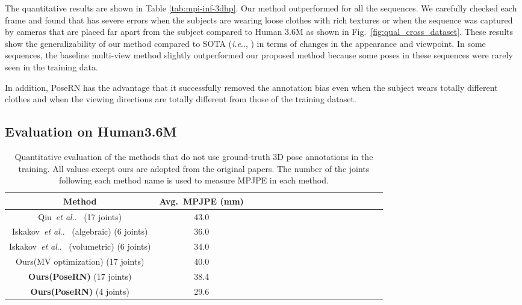 \documentclass{article}
\makeatletter
\newcommand{\figref}[1]{{Fig.~\ref{fig:#1}}}
\newcommand{\tabref}[1]{{Table \ref{tab:#1}}}
\DeclareRobustCommand\onedot{\futurelet\@let@token\@onedot}
\def\@onedot{\ifx\@let@token.\else.\null\fi\xspace}
\def\ie{\emph{i.e}\onedot} \def\Ie{\emph{I.e}\onedot}
\def\etal{\emph{et al}\onedot}
\makeatother
\begin{document}
The quantitative results are shown in \tabref{mpi-inf-3dhp}. Our method outperformed \cite{iskakov2019learnable} for all the sequences. We carefully checked each frame and found that \cite{iskakov2019learnable} has severe errors when the subjects are wearing loose clothes with rich textures or when the sequence was captured by cameras that are placed far apart from the subject compared to Human 3.6M as shown in \figref{qual_cross_dataset}. These results show the generalizability of our method compared to SOTA (\ie, \cite{iskakov2019learnable}) in terms of changes in the appearance and viewpoint. 
In some sequences, the baseline multi-view method slightly outperformed our proposed method because some poses in these sequences were rarely seen in the training data.

In addition, PoseRN has the advantage that it successfully removed the annotation bias even when the subject wears totally different clothes and when the viewing directions are totally different from those of the training dataset.

\vspace{-0.1cm}
\subsection{Evaluation on Human3.6M}\label{sec:exp_3Dpose}
\vspace{-0.1cm}
\begin{table}[t]
    \centering
    \caption{Quantitative evaluation of the methods that do not use ground-truth 3D pose annotations in the training. All values except ours are adopted from the original papers. The number of the joints following each method name is used to measure MPJPE in each method.}
    \vspace{-0.2cm}
    \label{tab:exp_3Dpose_MV}
    \begin{tabular}{cccccccccccccccccc}
    \toprule
      Method  & Avg.~MPJPE (mm)\\ 
      \midrule
    Qiu~\etal~\cite{multiviewpose} (17 joints) & 43.0 \\
    Iskakov~\etal~\cite{iskakov2019learnable} (algebraic) (6 joints) & 36.0 \\
    Iskakov~\etal~\cite{iskakov2019learnable} (volumetric) (6 joints) & 34.0 \\
    Ours(MV optimization) (17 joints) & 40.0 \\
    \textbf{Ours(PoseRN)} (17 joints) & 38.4 \\
    \textbf{Ours(PoseRN)} (4 joints) & 29.6 \\
    \bottomrule
    \end{tabular}
    \vspace{-.5cm}
\end{table}
\end{document}
